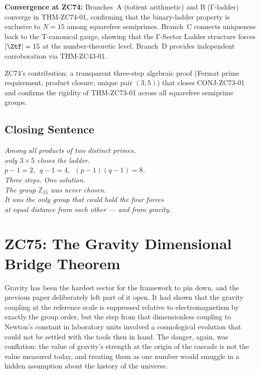 \documentclass[12pt, a4paper]{article}
\begin{document}
\begin{genealogybox}[title={How ZC74's Key Objects Trace Back}]
\textbf{Convergence at ZC74:}
Branches~A (totient arithmetic) and B (Γ-ladder) converge in
THM-ZC74-01, confirming that the binary-ladder property is
exclusive to $N=15$ among squarefree semiprimes.
Branch~C connects uniqueness back to the T-canonical gauge,
showing that the Γ-Sector Ladder structure forces $|\Ztf|=15$
at the number-theoretic level.
Branch~D provides independent corroboration via THM-ZC43-01.

ZC74's contribution: a transparent three-step algebraic proof
(Fermat prime requirement, product closure, unique pair $(3,5)$)
that closes CONJ-ZC73-01 and confirms the rigidity of
THM-ZC73-01 across all squarefree semiprime groups.
\end{genealogybox}

\subsection{Closing Sentence}

\bigskip
\begin{center}
\textit{%
  Among all products of two distinct primes,\\
  only $3 \times 5$ closes the ladder.\\[0.5em]
  $p - 1 = 2$, $\;q - 1 = 4$, $\;(p-1)(q-1) = 8$.\\
  Three steps. One solution.\\[0.5em]
  The group $\mathbb{Z}_{15}$ was never chosen.\\
  It was the only group that could hold the four forces\\
  at equal distance from each other --- and from gravity.
}
\end{center}



\section{ZC75: The Gravity Dimensional Bridge Theorem}

Gravity has been the hardest sector for the framework to pin down, and the
previous paper deliberately left part of it open. It had shown that the
gravity coupling at the reference scale is suppressed relative to
electromagnetism by exactly the group order, but the step from that
dimensionless coupling to Newton's constant in laboratory units involved a
cosmological evolution that could not be settled with the tools then in hand.
The danger, again, was conflation: the value of gravity's strength at the
origin of the cascade is not the value measured today, and treating them as
one number would smuggle in a hidden assumption about the history of the
universe.
\end{document}
